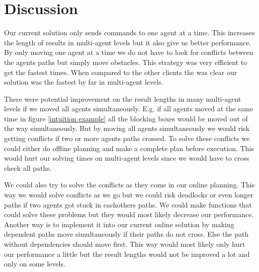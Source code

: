 \section{Discussion}
\label{sec:discussion}
Our current solution only sends commands to one agent at a time.
This increases the length of results in multi-agent levels but it also give us better performance.
By only moving one agent at a time we do not have to look for conflicts between the agents paths but simply move obstacles.
This strategy was very efficient to get the fastest times.
When compared to the other clients the was clear our solution was the fastest by far in multi-agent levels.

There were potential improvement on the result lengths in many multi-agent levels if we moved all agents simultaneously.
E.g. if all agents moved at the same time in figure \ref{intuition example} all the blocking boxes would be moved out of the way simultaneously.
But by moving all agents simultaneously we would risk getting conflicts if two or more agents paths crossed.
To solve these conflicts we could either do offline planning and make a complete plan before execution.
This would hurt our solving times on multi-agent levels since we would have to cross check all paths.

We could also try to solve the conflicts as they come in our online planning.
This way we would solve conflicts as we go but we could risk deadlocks or even longer paths if two agents got stuck in eachothers paths.
We could make functions that could solve these problems but they would most likely decrease our performance.
Another way is to implement it into our current online solution by making dependent paths move simultaneously if their paths do not cross.
Else the path without dependencies should move first.
This way would most likely only hurt our performance a little but the result lengths would not be improved a lot and only on some levels.




